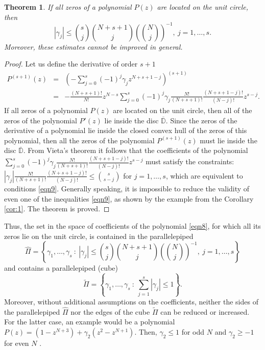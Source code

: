 \documentclass[12pt]{article}
\newtheorem{thm}{Theorem}[section]
\newcommand{\abs}[1]{\left|#1\right|}
\newcommand{\pa}[1]{\left(#1\right)}
\newcommand{\cb}[1]{\left\{#1\right\}}
\begin{document}
\begin{thm}\label{thm4}
If all zeros of a polynomial $P(z)$ are located on the unit circle, then
\begin{equation}\label{eqn9}
\abs{\gamma_j} \leq {s \choose j}{N + s + 1 \choose j}\pa{{N \choose j}}^{-1}, \ j = 1,\ldots,s.
\end{equation}
Moreover, these estimates cannot be improved in general.
\end{thm}

\begin{proof}
Let us define the derivative of order $s + 1$
\begin{eqnarray*}
P^{(s + 1)}(z) &=& \pa{-\sum_{j = 0}^{s}(-1)^j\gamma_jz^{N + s + 1 - j}}^{(s + 1)} \\
&=& -\frac{(N + s+ 1)!}{N!}z^{N - s}\sum_{j = 0}^{s}(-1)^j\gamma_j\frac{N!}{(N + s + 1)!}\frac{(N + s + 1 - j)!}{(N - j)!}z^{s - j}.
\end{eqnarray*}
If all zeros of a polynomial $P(z)$ are located on the unit circle, then all of the zeros of the polynomial $P'(z)$ lie inside the disc $\overline{\mathbb D}$. Since the zeros of the derivative of a polynomial lie inside the closed convex hull of the zeros of this polynomial, then all the zeros of the polynomial $P^{(s + 1)}(z)$ must lie inside the disc $\overline{\mathbb D}$. From Vieta's theorem it follows that the coefficients of the polynomial $\displaystyle \sum_{j = 0}^{s}(-1)^j\gamma_j\frac{N!}{(N + s + 1)!}\frac{(N + s + 1 - j)!}{(N - j)!}z^{s - j}$ must satisfy the constraints:
$\displaystyle |\gamma_j|\frac{N!}{(N + s + 1)!}\frac{(N + s + 1 - j)!}{(N - j)!} \leq {s \choose s - j}$ for $j = 1, \ldots, s$, which are equivalent to conditions \eqref{eqn9}. Generally speaking, it is impossible to reduce the validity of even one of the inequalities \eqref{eqn9}, as shown by the example from the Corollary \ref{cor:1}. 
The theorem is proved.
\end{proof}

Thus, the set in the space of coefficients of the polynomial \eqref{eqn8}, for which all its zeros lie on the unit circle, is contained in the parallelepiped
\begin{displaymath}
\hat{\Pi} = \cb{\gamma_1,\ldots,\gamma_s \ : \ \abs{\gamma_j} \leq {s \choose j}{N + s + 1 \choose j}\pa{{N \choose j}}^{-1}, \ j = 1,\ldots,s }
\end{displaymath}
and contains a parallelepiped (cube)
\begin{displaymath}
\tilde{\Pi} = \cb{\gamma_1,\ldots,\gamma_s \ : \ \sum_{j = 1}^{s}\abs{\gamma_j} \leq 1}.
\end{displaymath}
Moreover, without additional assumptions on the coefficients, neither the sides of the parallelepiped $\hat{\Pi}$ nor the edges of the cube $\tilde{\Pi}$ can be reduced or increased. For the latter case, an example would be a polynomial $P(z) = \pa{1 - z^{N + 3}} + \gamma_2\pa{z^2 - z^{N + 1}}$. Then, $\gamma_2 \leq 1$ for odd $N$ and $\gamma_2 \geq -1$ for even $N$ \cite{ref1}.
\end{document}
